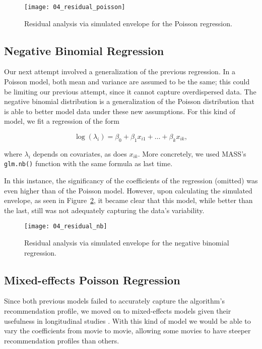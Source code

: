 \begin{figure}
  \centering
  \texttt{[image: 04\_residual\_poisson]}
  \caption{Residual analysis via simulated envelope for the Poisson regression.\label{fig:fig04_residual_poisson}}
\end{figure}

\subsection{Negative Binomial Regression}
\label{subsec:negbin04}

Our next attempt involved a generalization of the previous regression. In a
Poisson model, both mean and variance are assumed to be the same; this could be
limiting our previous attempt, since it cannot capture overdispersed data. The
negative binomial distribution is a generalization of the Poisson distribution
\citep{} that is able to better model data under these new assumptions. For this %
kind of model, we fit a regression of the form

$$
\log(\lambda_i) = \beta_0 + \beta_1 x_{i1} + \dots + \beta_k x_{ik},
$$

\noindent where $\lambda_i$ depends on covariates, as does $x_{ik}$. More
concretely, we used MASS's \citep{} \verb|glm.nb()| function with the same
formula as last time.

In this instance, the significancy of the coefficients of the regression
(omitted) was even higher than of the Poisson model. However, upon calculating
the simulated envelope, as seen in Figure~\ref{fig:fig04_residual_nb}, it became
clear that  this model, while better than the last, still was not adequately
capturing the data's variability.

\begin{figure}
  \centering
  \texttt{[image: 04\_residual\_nb]}
  \caption{Residual analysis via simulated envelope for the negative binomial regression.\label{fig:fig04_residual_nb}}
\end{figure}

\subsection{Mixed-effects Poisson Regression}
\label{subsec:mmpoisson04}

Since both previous models failed to accurately capture the algorithm's
recommendation profile, we moved on to mixed-effects models given their
usefulness in longitudinal studies \citep{}. %
With this kind of model we would be able to vary the coefficients from movie to
movie, allowing some movies to have steeper recommendation profiles than others.

